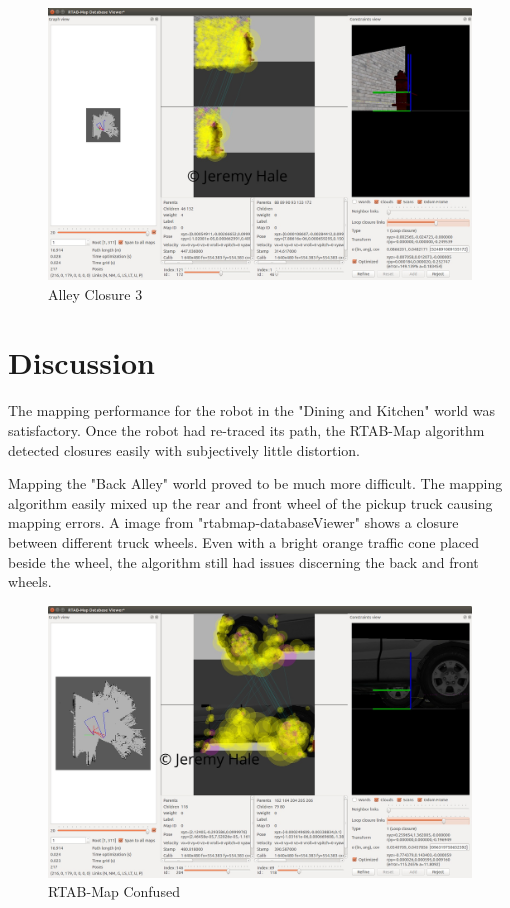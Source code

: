 \documentclass[10pt,journal,compsoc]{IEEEtran}
\begin{document}
\begin{figure}
    \centering
    \includegraphics[width=\linewidth]{alley_closure_3}
    \caption{Alley Closure 3}
    \label{fig:alley_closure_3}
\end{figure}

\section{Discussion}
The mapping performance for the robot in the "Dining and Kitchen" world was satisfactory. Once the robot had re-traced its path, the RTAB-Map algorithm detected closures easily with subjectively little distortion.

Mapping the "Back Alley" world proved to be much more difficult. The mapping algorithm easily mixed up the rear and front wheel of the pickup truck causing mapping errors. A image from "rtabmap-databaseViewer" shows a closure between different truck wheels. Even with a bright orange traffic cone placed beside the wheel, the algorithm still had issues discerning the back and front wheels.

\begin{figure}
    \centering
    \includegraphics[width=\linewidth]{confused_cone_viewer}
    \caption{RTAB-Map Confused}
    \label{fig:confused}
\end{figure}
\end{document}
